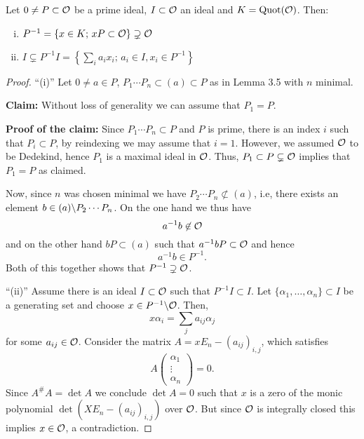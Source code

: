 \begin{Lem}
	Let $0 \neq P \subset \mathcal{O}$ be a prime ideal, $I \subset \mathcal{O}$ an ideal and $K=\operatorname{Quot}(\mathcal{O})$. Then:
	\begin{enumerate}[(i)]
		\item $P^{-1} = \{ x \in K; \, xP \subset \mathcal{O} \} \supsetneq \mathcal{O} $
		\item $ I \subsetneq P^{-1} I = \left\{  \sum_i a_ix_i; \, a_i \in I, x_i \in P^{-1}  \right\}$
	\end{enumerate}
\end{Lem}

\begin{proof}
	\enquote{(i)} Let $0 \neq a \in P$, $P_1 \cdots P_n \subset (a) \subset P$ as in Lemma 3.5 with $n$ minimal.
	

	\bigskip
	\textbf{Claim:} Without loss of generality we can assume that $P_1 =P$.
	
	\textbf{Proof of the claim:}
	Since $P_1 \cdots P_n \subset P$ and $P$ is prime, there is an index $i$ such that $P_i \subset P$, by reindexing we may assume that $i=1$.
	However, we assumed $\mathcal{O}$ to be Dedekind, hence $P_1$ is a maximal ideal in $\mathcal{O}$. Thus,  $P_1 \subset P \subsetneq \mathcal{O}$ implies that $P_1 = P$ as claimed.
	
	\bigskip
	Now, since $n$ was chosen minimal we have $P_2 \cdots P_n \not\subset (a)$, i.e, there exists an element $b \in (a) \backslash P_2 \cdots P_n$. On the one hand we thus have
	\[ a^{-1} b \not \in \mathcal{O}
	\]
	and on the other hand $bP \subset (a)$ such that $a^{-1}bP \subset \mathcal{O}$ and hence
	\[ a^{-1} b \in P^{-1}.
	\]
	Both of this together shows that $P^{-1} \supsetneq \mathcal{O}$.
	
	\bigskip \enquote{(ii)} Assume there is an ideal $I \subset \mathcal{O}$ such that $P^{-1} I \subset I$. Let $\{\alpha_1, \dots, \alpha_n \} \subset I$ be a generating set and choose $x \in P^{-1} \backslash \mathcal{O}$. Then,
	\[ x \alpha_i = \sum_j a_{ij} \alpha_j
	\]
	for some $a_{ij} \in \mathcal{O}$. Consider the matrix $A=  xE_n - \left( a_{ij}\right)_{i,j}$, which satisfies
	\[ A \begin{pmatrix}
	\alpha_1 \\ \vdots \\ \alpha_n
	\end{pmatrix}
	= 0.
	\]
	Since $A^\#A = \det A$ we conclude $\det A =0$ such that $x$ is a zero of the monic polynomial $\det \left(  XE_n - \left( a_{ij}\right)_{i,j} \right)$ over $\mathcal{O}$. But since $\mathcal{O}$ is integrally closed this implies $x \in \mathcal{O}$, a contradiction.
\end{proof}


